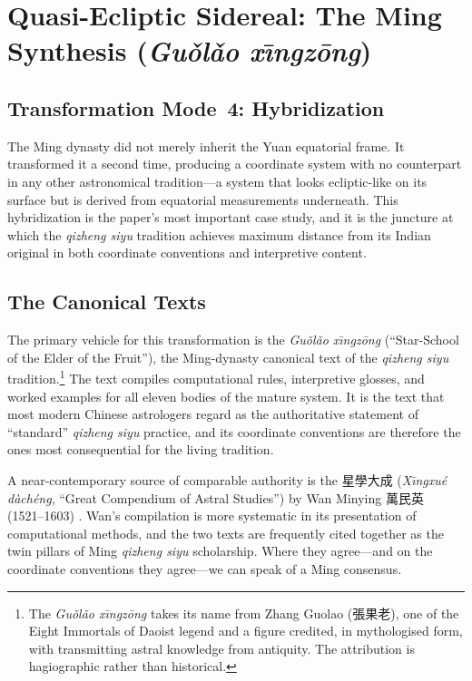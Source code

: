 \documentclass[10pt,a4paper]{article}
\newcommand{\zh}[1]{#1}
\begin{document}
\section{Quasi-Ecliptic Sidereal: The Ming Synthesis (\textit{Gu\v{o}l\v{a}o x\={\i}ngz\={o}ng})}
\label{sec:ming}

\subsection*{Transformation Mode~4: Hybridization}

The Ming dynasty did not merely inherit the Yuan equatorial frame.  It
transformed it a second time, producing a coordinate system with no
counterpart in any other astronomical tradition---a system that looks
ecliptic-like on its surface but is derived from equatorial
measurements underneath.  This hybridization is the paper's most
important case study, and it is the juncture at which the
\textit{qizheng siyu} tradition achieves maximum distance from its Indian
original in both coordinate conventions and interpretive content.

\subsection*{The Canonical Texts}

The primary vehicle for this transformation is the
\textit{Gu\v{o}l\v{a}o x\={\i}ngz\={o}ng} (``Star-School
of the Elder of the Fruit''), the Ming-dynasty canonical text of the
\textit{qizheng siyu} tradition.\footnote{The \textit{Gu\v{o}l\v{a}o x\={\i}ngz\={o}ng} takes its name
from Zhang Guolao (\zh{張果老}), one of the Eight Immortals of Daoist
legend and a figure credited, in mythologised form, with transmitting
astral knowledge from antiquity.  The attribution is hagiographic
rather than historical.}  The text compiles computational rules,
interpretive glosses, and worked examples for all eleven bodies of
the mature system.  It is the text that most modern Chinese
astrologers regard as the authoritative statement of ``standard''
\textit{qizheng siyu} practice, and its coordinate conventions are therefore
the ones most consequential for the living tradition.

A near-contemporary source of comparable authority is the
\zh{星學大成} (\textit{X\={\i}ngxu\'e d\`ach\'eng}, ``Great Compendium
of Astral Studies'') by Wan Minying \zh{萬民英} (1521--1603)
\cite{ho2003astrology}.  Wan's compilation is more systematic in its
presentation of computational methods, and the two texts are
frequently cited together as the twin pillars of Ming
\textit{qizheng siyu} scholarship.  Where they agree---and on the coordinate
conventions they agree---we can speak of a Ming consensus.
\end{document}
